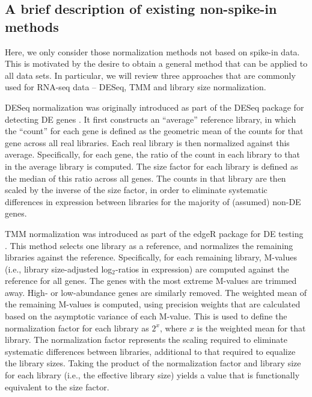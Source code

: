 \documentclass{bmcart}
\begin{document}
\subsection*{A brief description of existing non-spike-in methods}
Here, we only consider those normalization methods not based on spike-in data.
This is motivated by the desire to obtain a general method that can be applied to all data sets.
In particular, we will review three approaches that are commonly used for RNA-seq data -- DESeq, TMM and library size normalization.

DESeq normalization was originally introduced as part of the DESeq package for detecting DE genes \cite{anders2010differential}.
It first constructs an ``average'' reference library, in which the ``count'' for each gene is defined as the geometric mean of the counts for that gene across all real libraries.
Each real library is then normalized against this average.
Specifically, for each gene, the ratio of the count in each library to that in the average library is computed.
The size factor for each library is defined as the median of this ratio across all genes.
The counts in that library are then scaled by the inverse of the size factor,
    in order to eliminate systematic differences in expression between libraries for the majority of (assumed) non-DE genes.

TMM normalization was introduced as part of the edgeR package for DE testing \cite{robinson2010edgeR}.
This method selects one library as a reference, and normalizes the remaining libraries against the reference.
Specifically, for each remaining library, M-values (i.e., library size-adjusted log$_2$-ratios in expression) are computed against the reference for all genes.
The genes with the most extreme M-values are trimmed away.
High- or low-abundance genes are similarly removed.
The weighted mean of the remaining M-values is computed, using precision weights that are calculated based on the asymptotic variance of each M-value.
This is used to define the normalization factor for each library as $2^x$, where $x$ is the weighted mean for that library.
The normalization factor represents the scaling required to eliminate systematic differences between libraries, additional to that required to equalize the library sizes.
Taking the product of the normalization factor and library size for each library (i.e., the effective library size) yields a value that is functionally equivalent to the size factor.
\end{document}
